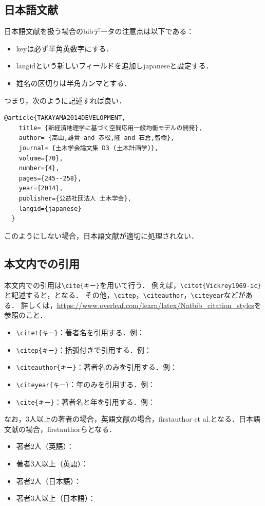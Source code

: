 \documentclass[../main/main]{subfiles}
\begin{document}
\subsection{日本語文献}\label{subsec:japanese_bib}
日本語文献を扱う場合のbibデータの注意点は以下である：
\begin{itemize}
  \item keyは必ず半角英数字にする．
  \item langidという新しいフィールドを追加しjapaneseと設定する．
  \item 姓名の区切りは半角カンマとする．
\end{itemize}
つまり，次のように記述すれば良い．
  \begin{lstlisting}[language={[latex]TeX}]
    @article{TAKAYAMA2014DEVELOPMENT,
    title= {新経済地理学に基づく空間応用一般均衡モデルの開発},
    author= {高山,雄貴 and 赤松,隆 and 石倉,智樹},
    journal= {土木学会論文集 D3 (土木計画学)},
    volume={70},
    number={4},
    pages={245--258},
    year={2014},
    publisher={公益社団法人 土木学会},
    langid={japanese}
  }
  \end{lstlisting}
このようにしない場合，日本語文献が適切に処理されない．

\subsection{本文内での引用}
本文内での引用は\verb|\cite{キー}|を用いて行う．
例えば，\verb|\citet{Vickrey1969-ic}|と記述すると，\citet{Vickrey1969-ic}となる．
その他，\verb|\citep|，\verb|\citeauthor|，\verb|\citeyear|などがある．
詳しくは，\url{https://www.overleaf.com/learn/latex/Natbib\_citation\_styles}を参照のこと．
  \begin{itemize}
    \item \verb|\citet{キー}|：著者名を引用する．例：\citet{Vickrey1969-ic}
    \item \verb|\citep{キー}|：括弧付きで引用する．例：\citep{Vickrey1969-ic}
    \item \verb|\citeauthor{キー}|：著者名のみを引用する．例：\citeauthor{Vickrey1969-ic}
    \item \verb|\citeyear{キー}|：年のみを引用する．例：\citeyear{Vickrey1969-ic}
    \item \verb|\cite{キー}|：著者名と年を引用する．例：\cite{Vickrey1969-ic}
  \end{itemize}
 なお，3人以上の著者の場合，英語文献の場合，firstauthor et al.となる．日本語文献の場合，firstauthorらとなる．
\begin{itemize}
  \item 著者2人（英語）：\citet{arnott2011corridor}
  \item 著者3人以上（英語）：\citet{arnott1990economics}
  \item 著者2人（日本語）：\citet{TAKAYAMA2011SPATIAL}
  \item 著者3人以上（日本語）：\citet{TAKAYAMA2014DEVELOPMENT}
\end{itemize}
\end{document}
